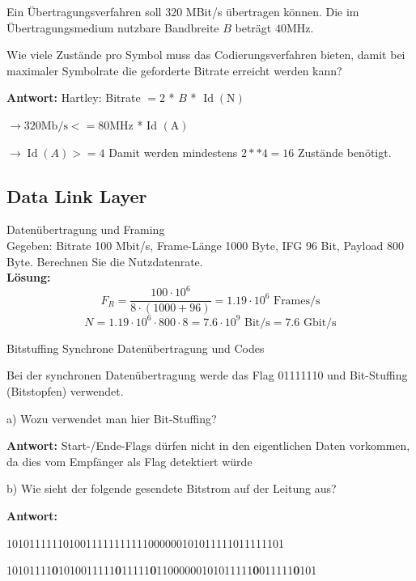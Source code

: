  \begin{example2}{Ein Übertragungsverfahren}
  soll 320 MBit/s übertragen können. Die im Übertragungsmedium nutzbare Bandbreite $B$ beträgt $40 \mathrm{MHz}$.

Wie viele Zustände pro Symbol muss das Codierungsverfahren bieten, damit bei maximaler Symbolrate die geforderte Bitrate erreicht werden kann? 

\textbf{Antwort:}
Hartley: Bitrate $=2$ * $B$ * $\operatorname{Id}(\mathrm{N})$

$\rightarrow 320 \mathrm{Mb} / \mathrm{s}<=80 \mathrm{MHz}$ * Id $(\mathrm{A})$

$\rightarrow \operatorname{Id}(A)>=4$ Damit werden mindestens $2 * * 4=16$ Zustände benötigt.
 \end{example2}

\subsection*{Data Link Layer}

\begin{example2}{Datenübertragung und Framing}\\
    Gegeben: Bitrate 100 Mbit/s, Frame-Länge 1000 Byte, IFG 96 Bit, Payload 800 Byte. Berechnen Sie die Nutzdatenrate.\\
    \textbf{Lösung:}\\
    $$F_R = \frac{100 \cdot 10^6}{8 \cdot (1000 + 96)} = 1.19 \cdot 10^6 \text{ Frames/s}$$
    $$N = 1.19 \cdot 10^6 \cdot 800 \cdot 8 = 7.6 \cdot 10^9 \text{ Bit/s} = 7.6 \text{ Gbit/s}$$
\end{example2}

 \begin{example2}{Bitstuffing}
  Synchrone Datenübertragung und Codes
  
  Bei der synchronen Datenübertragung werde das Flag 01111110 und Bit-Stuffing (Bitstopfen) verwendet.
  
  a) Wozu verwendet man hier Bit-Stuffing?
  
  \textbf{Antwort:}
  Start-/Ende-Flags dürfen nicht in den eigentlichen Daten vorkommen, da dies vom Empfänger als Flag detektiert würde
  
  b) Wie sieht der folgende gesendete Bitstrom auf der Leitung aus?
  
  \textbf{Antwort:}

  1010111111010011111111111000000101011111011111101
  
  10101111\textbf{0}1010011111\textbf{0}11111\textbf{0}11000000101011111\textbf{0}011111\textbf{0}101
  \end{example2}

